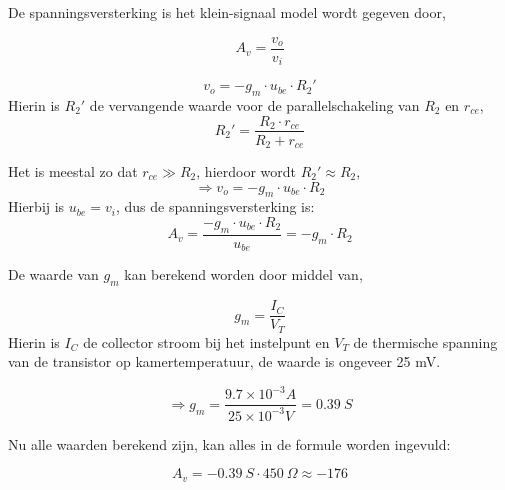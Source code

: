 \documentclass{article}
\begin{document}
De spanningsversterking is het klein-signaal model wordt gegeven door,

\begin{equation}
A_v=\frac{v_o}{v_i}
\end{equation}

\begin{equation}
v_o=-g_m\cdot u_{be}\cdot R_2'
\end{equation}
Hierin is $R_2'$ de vervangende waarde voor de parallelschakeling van $R_2$ en $r_{ce}$,
$$R_2'=\frac{R_2\cdot r_{ce}}{R_2+r_{ce}}$$

\noindent Het is meestal zo dat $r_{ce}\gg R_2$, hierdoor wordt $R_2'\approx R_2$,
$$\Rightarrow v_o=-g_m\cdot u_{be}\cdot R_2$$
Hierbij is $u_{be}=v_i$, dus de spanningsversterking is:
$$A_v=\frac{-g_m\cdot u_{be}\cdot R_2}{u_{be}}=-g_m\cdot R_2$$

\noindent De waarde van $g_m$ kan berekend worden door middel van,

\begin{equation}
g_m=\frac{I_C}{V_T}
\end{equation}
Hierin is $I_C$ de collector stroom bij het instelpunt en $V_T$ de thermische spanning van de transistor op kamertemperatuur, de waarde is ongeveer 25 mV.

$$\Rightarrow g_m=\frac{9.7\times 10^{-3}A}{25\times 10^{-3}V}= 0.39 \: S$$

Nu alle waarden berekend zijn, kan alles in de formule worden ingevuld:

$$A_v= -0.39 \: S\cdot 450 \: \Omega\approx -176 $$
\end{document}
